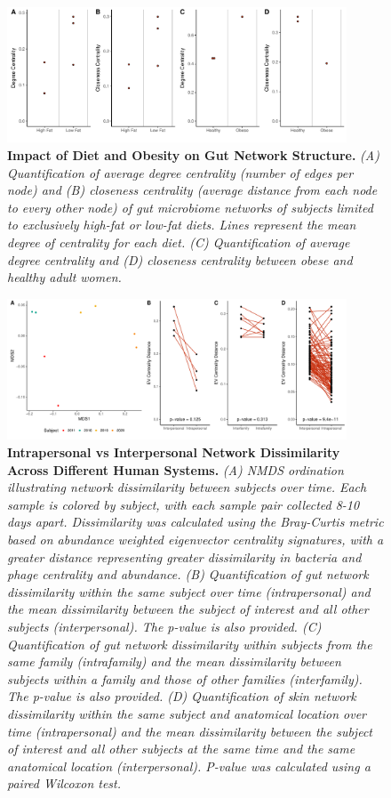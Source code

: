 \documentclass[12pt,]{article}
\begin{document}
\begin{figure}[htbp]
\centering
\includegraphics[width=0.90000\textwidth]{../figures/dietnetworks.pdf}
\caption{\textbf{Impact of Diet and Obesity on Gut Network Structure.}
\emph{(A) Quantification of average degree centrality (number of edges
per node) and (B) closeness centrality (average distance from each node
to every other node) of gut microbiome networks of subjects limited to
exclusively high-fat or low-fat diets. Lines represent the mean degree
of centrality for each diet. (C) Quantification of average degree
centrality and (D) closeness centrality between obese and healthy adult
women.}\label{dietnetworks}}
\end{figure}

\newpage

\begin{figure}[htbp]
\centering
\includegraphics[width=0.90000\textwidth]{../figures/intrapersonal_diversity.pdf}
\caption{\textbf{Intrapersonal vs Interpersonal Network Dissimilarity
Across Different Human Systems.} \emph{(A) NMDS ordination illustrating
network dissimilarity between subjects over time. Each sample is colored
by subject, with each sample pair collected 8-10 days apart.
Dissimilarity was calculated using the Bray-Curtis metric based on
abundance weighted eigenvector centrality signatures, with a greater
distance representing greater dissimilarity in bacteria and phage
centrality and abundance. (B) Quantification of gut network
dissimilarity within the same subject over time (intrapersonal) and the
mean dissimilarity between the subject of interest and all other
subjects (interpersonal). The p-value is also provided. (C)
Quantification of gut network dissimilarity within subjects from the
same family (intrafamily) and the mean dissimilarity between subjects
within a family and those of other families (interfamily). The p-value
is also provided. (D) Quantification of skin network dissimilarity
within the same subject and anatomical location over time
(intrapersonal) and the mean dissimilarity between the subject of
interest and all other subjects at the same time and the same anatomical
location (interpersonal). P-value was calculated using a paired Wilcoxon
test.}\label{intradiv}}
\end{figure}
\end{document}
